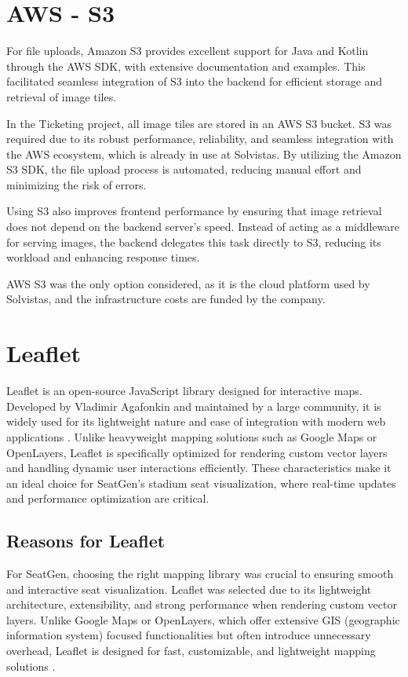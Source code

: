 \section{AWS - S3}
For file uploads, Amazon S3 provides excellent support for Java and Kotlin through the AWS SDK, with extensive documentation and examples. This facilitated seamless integration of S3 into the backend for efficient storage and retrieval of image tiles.

In the Ticketing project, all image tiles are stored in an AWS S3 bucket. S3 was required due to its robust performance, reliability, and seamless integration with the AWS ecosystem, which is already in use at Solvistas. By utilizing the Amazon S3 SDK, the file upload process is automated, reducing manual effort and minimizing the risk of errors.

Using S3 also improves frontend performance by ensuring that image retrieval does not depend on the backend server’s speed. Instead of acting as a middleware for serving images, the backend delegates this task directly to S3, reducing its workload and enhancing response times.

AWS S3 was the only option considered, as it is the cloud platform used by Solvistas, and the infrastructure costs are funded by the company.

\section{Leaflet}
Leaflet is an open-source JavaScript library designed for interactive maps. Developed by Vladimir Agafonkin and maintained by a large community, it is widely used for its lightweight nature and ease of integration with modern web applications \cite{Leaflet}. Unlike heavyweight mapping solutions such as Google Maps or OpenLayers, Leaflet is specifically optimized for rendering custom vector layers and handling dynamic user interactions efficiently. These characteristics make it an ideal choice for SeatGen’s stadium seat visualization, where real-time updates and performance optimization are critical.

\subsection{Reasons for Leaflet}
For SeatGen, choosing the right mapping library was crucial to ensuring smooth and interactive seat visualization. Leaflet was selected due to its lightweight architecture, extensibility, and strong performance when rendering custom vector layers. Unlike Google Maps or OpenLayers, which offer extensive GIS (geographic information system) focused functionalities but often introduce unnecessary overhead, Leaflet is designed for fast, customizable, and lightweight mapping solutions \cite{Leaflet}.

